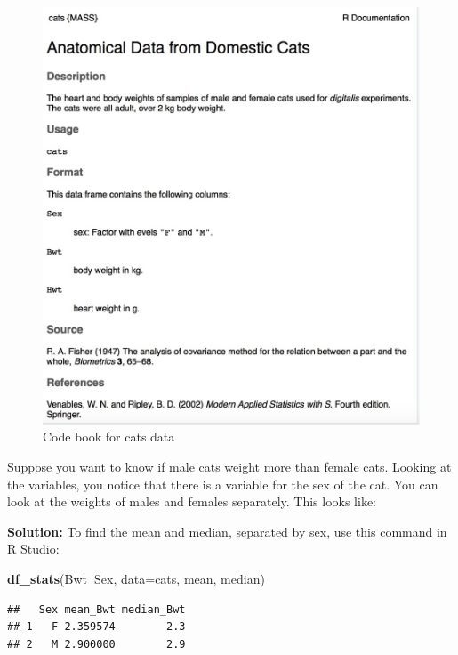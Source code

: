 \documentclass[
]{book}
\newenvironment{Shaded}{\begin{snugshade}}{\end{snugshade}}
\newcommand{\DataTypeTok}[1]{\textcolor[rgb]{0.13,0.29,0.53}{#1}}
\newcommand{\KeywordTok}[1]{\textcolor[rgb]{0.13,0.29,0.53}{\textbf{#1}}}
\newcommand{\NormalTok}[1]{#1}
\newcommand{\OperatorTok}[1]{\textcolor[rgb]{0.81,0.36,0.00}{\textbf{#1}}}
\begin{document}
\begin{figure}
\centering
\includegraphics{code_book_cats.jpg}
\caption{Code book for cats data}
\end{figure}

Suppose you want to know if male cats weight more than female cats. Looking at the variables, you notice that there is a variable for the sex of the cat. You can look at the weights of males and females separately. This looks like:

\textbf{Solution:}
To find the mean and median, separated by sex, use this command in R Studio:

\begin{Shaded}
\begin{Highlighting}[]
\KeywordTok{df_stats}\NormalTok{(Bwt}\OperatorTok{~}\NormalTok{Sex, }\DataTypeTok{data=}\NormalTok{cats, mean, median)}
\end{Highlighting}
\end{Shaded}

\begin{verbatim}
##   Sex mean_Bwt median_Bwt
## 1   F 2.359574        2.3
## 2   M 2.900000        2.9
\end{verbatim}
\end{document}
